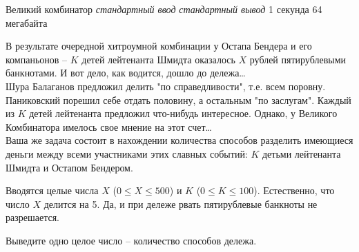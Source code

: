 \begin{problem}%
{Великий комбинатор}%
{\textsl{стандартный ввод}}%
{\textsl{стандартный вывод}}%
{1 секунда}%
{64 мегабайта}{}

В результате очередной хитроумной комбинации у Остапа Бендера и его компаньонов – $K$ детей лейтенанта Шмидта оказалось $X$ рублей пятирублевыми банкнотами. И вот дело, как водится, дошло до дележа\dots\\

Шура Балаганов предложил делить "по справедливости", т.е. всем поровну. Паниковский порешил себе отдать половину, а остальным "по заслугам". Каждый из $K$ детей лейтенанта предложил что-нибудь интересное. Однако, у Великого Комбинатора имелось свое мнение на этот счет\dots\\

Ваша же задача состоит в нахождении количества способов разделить имеющиеся деньги между всеми участниками этих славных событий: $K$ детьми лейтенанта Шмидта и Остапом Бендером.

\InputFile

Вводятся целые числа $X$ ($0 \le X \le 500$) и $K$ ($0 \le K \le 100$). Естественно, что число $X$ делится на 5. Да, и при дележе рвать пятирублевые банкноты не разрешается.

\OutputFile

Выведите одно целое число – количество способов дележа.

\Examples

\begin{example}
%
\end{example}
\end{problem}